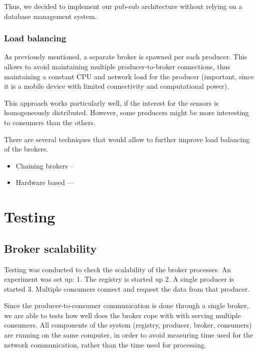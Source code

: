 Thus, we decided to implement our pub-sub architecture without relying
on a database management system.

\subsubsection{Load balancing}\label{load-balancing}

As previously mentioned, a separate broker is spawned per each producer.
This allows to avoid maintaining multiple producer-to-broker
connections, thus maintaining a constant CPU and network load for the
producer (important, since it is a mobile device with limited
connectivity and computational power).

This approach works particularly well, if the interest for the sensors
is homogeneously distributed. However, some producers might be more
interesting to consumers than the others.

There are several techniques that would allow to further improve load
balancing of the brokers.

\begin{itemize}
\itemsep1pt\parskip0pt
\item
  Chaining brokers --
\item
  Hardware based ---
\end{itemize}

\section{Testing}\label{testing}

\subsection{Broker scalability}\label{broker-scalability}

Testing was conducted to check the scalability of the broker processes.
An experiment was set up: 1. The registry is started up 2. A single
producer is started 3. Multiple consumers connect and request the data
from that producer.

Since the producer-to-consumer communication is done through a single
broker, we are able to tests how well does the broker cope with with
serving multiple consumers. All components of the system (registry,
producer, broker, consumers) are running on the same computer, in order
to avoid measuring time used for the network communication, rather than
the time used for processing.

